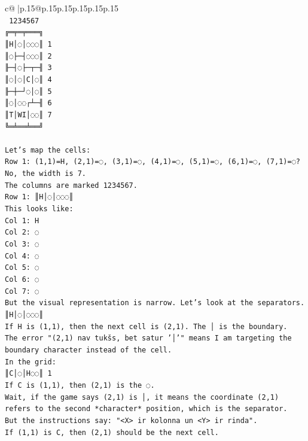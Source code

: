 \documentclass{article}
\begin{document}
{\begin{supertabular}{c@{$\;$}|p{.15\linewidth}@{}p{.15\linewidth}p{.15\linewidth}p{.15\linewidth}p{.15\linewidth}p{.15\linewidth}}
{{{\\ 
\texttt{ 1234567} \\
\texttt{╔═╤═╤═══╗} \\
\texttt{║H│◌│◌◌◌║ 1} \\
\texttt{║◌├─┤◌◌◌║ 2} \\
\texttt{╟─┤◌├─┬─╢ 3} \\
\texttt{║◌│◌│C│◌║ 4} \\
\texttt{╟─┼─┘◌│◌║ 5} \\
\texttt{║◌│◌◌┌┴─╢ 6} \\
\texttt{║T│WI│◌◌║ 7} \\
\texttt{╚═╧══╧══╝} \\
\\ 
\texttt{Let's map the cells:} \\
\texttt{Row 1: (1,1)=H, (2,1)=◌, (3,1)=◌, (4,1)=◌, (5,1)=◌, (6,1)=◌, (7,1)=◌? No, the width is 7.} \\
\texttt{The columns are marked 1234567.} \\
\texttt{Row 1: ║H│◌│◌◌◌║} \\
\texttt{This looks like:} \\
\texttt{Col 1: H} \\
\texttt{Col 2: ◌} \\
\texttt{Col 3: ◌} \\
\texttt{Col 4: ◌} \\
\texttt{Col 5: ◌} \\
\texttt{Col 6: ◌} \\
\texttt{Col 7: ◌} \\
\texttt{But the visual representation is narrow. Let's look at the separators.} \\
\texttt{║H│◌│◌◌◌║} \\
\texttt{If H is (1,1), then the next cell is (2,1). The │ is the boundary.} \\
\texttt{The error "(2,1) nav tukšs, bet satur '│'" means I am targeting the boundary character instead of the cell.} \\
\texttt{In the grid:} \\
\texttt{║C│◌│H◌◌║ 1} \\
\texttt{If C is (1,1), then (2,1) is the ◌.} \\
\texttt{Wait, if the game says (2,1) is │, it means the coordinate (2,1) refers to the second *character* position, which is the separator.} \\
\texttt{But the instructions say: "<X> ir kolonna un <Y> ir rinda".} \\
\texttt{If (1,1) is C, then (2,1) should be the next cell.} \\
}}}
\end{supertabular}}
\end{document}
